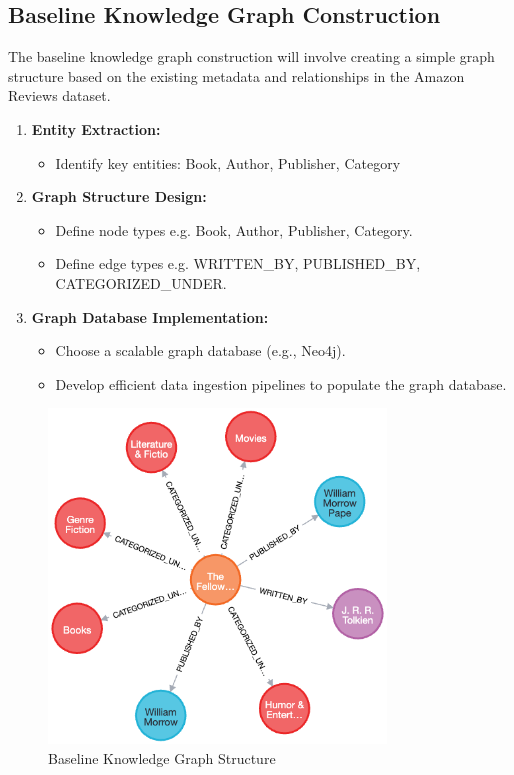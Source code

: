 \documentclass{article}
\begin{document}
\subsection{Baseline Knowledge Graph Construction}
The baseline knowledge graph construction will involve creating a simple graph
structure based on the existing metadata and relationships in the Amazon
Reviews dataset.
\begin{enumerate}
      \item \textbf{Entity Extraction:}
            \begin{itemize}
                  \item Identify key entities: Book, Author, Publisher,
                        Category
            \end{itemize}

      \item \textbf{Graph Structure Design:}
            \begin{itemize}
                  \item Define node types e.g. Book, Author, Publisher,
                        Category.
                  \item Define edge types e.g. WRITTEN\_BY, PUBLISHED\_BY,
                        CATEGORIZED\_UNDER.
            \end{itemize}

      \item \textbf{Graph Database Implementation:}
            \begin{itemize}
                  \item Choose a scalable graph database (e.g., Neo4j).
                  \item Develop efficient data ingestion pipelines to populate
                        the
                        graph
                        database.
            \end{itemize}
\end{enumerate}

\begin{figure}[H]
      \centering
      \includegraphics[width=0.8\textwidth]{img/baseline_kg.png}
      \caption{Baseline Knowledge Graph Structure}
      \label{fig:baseline_kg}
\end{figure}
\end{document}
